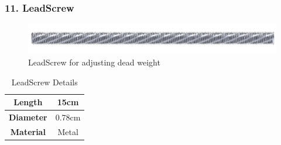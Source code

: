 \documentclass[12pt,a4paper,oneside]{book}
\begin{document}
			\subsubsection*{11. LeadScrew}
				\begin{figure}[H]
					\centering					
					\includegraphics[scale=1]{LEADSCREW}
					\caption{LeadScrew for adjusting dead weight}	 
				\end{figure}
				\begin{table}[H]
				\centering
				\def\arraystretch{1.5}
					\caption{LeadScrew Details}
					\vspace{0.5cm}
					\begin{tabular}{|c||c|}
					\hline
						\textbf{Length} & 15cm\\\hline
						\textbf{Diameter} & 0.78cm\\\hline
						\textbf{Material} & Metal\\\hline
					\end{tabular}
				\end{table}
				\pagebreak
			
\end{document}
